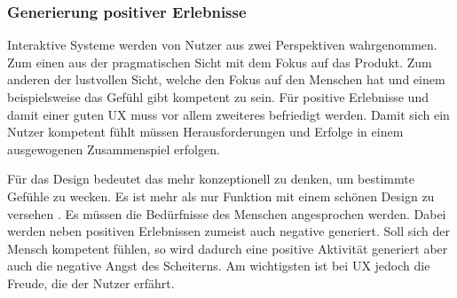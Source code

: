 \subsubsection*{Generierung positiver Erlebnisse}
Interaktive Systeme werden von Nutzer aus zwei Perspektiven wahrgenommen. Zum einen aus der pragmatischen Sicht mit dem Fokus auf das Produkt. Zum anderen der lustvollen Sicht, welche den Fokus auf den Menschen hat und einem beispielsweise das Gefühl gibt kompetent zu sein. Für positive Erlebnisse und damit einer guten UX muss vor allem zweiteres befriedigt werden. Damit sich ein Nutzer kompetent fühlt müssen Herausforderungen und Erfolge in einem ausgewogenen Zusammenspiel erfolgen. \cite{Hassenzahl2008}

Für das Design bedeutet das mehr konzeptionell zu denken, um bestimmte Gefühle zu wecken. Es ist mehr als nur Funktion mit einem schönen Design zu versehen \cite{Hassenzahl2008}. Es müssen die Bedürfnisse des Menschen angesprochen werden. Dabei werden neben positiven Erlebnissen zumeist auch negative generiert. Soll sich der Mensch kompetent fühlen, so wird dadurch eine positive Aktivität generiert aber auch die negative Angst des Scheiterns. Am wichtigsten ist bei UX jedoch die Freude, die der Nutzer erfährt.


